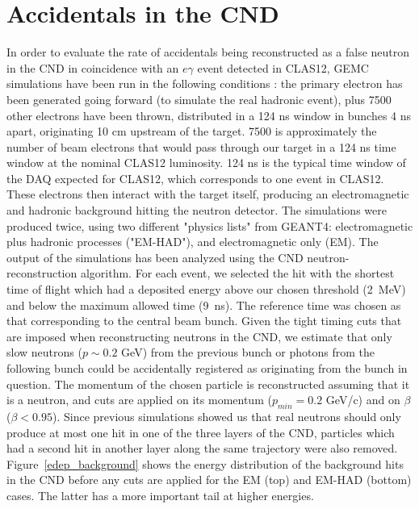 \section{Accidentals in the CND}\label{sec_accidentals}

In order to evaluate the rate of accidentals being reconstructed as a false neutron in the CND in coincidence with an $e\gamma$ event detected in CLAS12, GEMC simulations have been run in the following conditions \cite{raffa,proposal}: the primary electron has been generated going forward (to simulate the real hadronic event), plus 7500 other electrons have been thrown, distributed in a 124 ns window in bunches 4 ns apart, originating 10 cm upstream of the target. 7500 is approximately the number of beam electrons that would pass through our target in a 124 ns time window at the nominal CLAS12 luminosity. 124 ns is the typical time window of the DAQ expected for CLAS12, which corresponds to one event in CLAS12. These electrons then interact with the target itself, producing an electromagnetic and hadronic background hitting the neutron detector. The simulations were produced twice, using two different "physics lists" from GEANT4: electromagnetic plus hadronic processes ("EM-HAD"), and electromagnetic only (EM). The output of the simulations has been analyzed using the CND neutron-reconstruction algorithm. For each event, we selected the hit with the shortest time of flight which had a deposited energy above our chosen threshold (2~MeV) and below the maximum allowed time (9~ns). The reference time was chosen as that corresponding to the central beam bunch. Given the tight timing cuts that are imposed when reconstructing neutrons in the CND, we estimate that only slow neutrons ($p\sim 0.2$ GeV) from the previous bunch or photons from the following bunch could be accidentally registered as originating from the bunch in question. The momentum of the chosen particle is reconstructed assuming that it is a neutron, and cuts are applied on its momentum ($p_{min}= 0.2$ GeV/c) and on $\beta$ ($\beta<0.95$). Since previous simulations showed us that real neutrons should only produce at most one hit in one of the three layers of the CND, particles which had a second hit in another layer along the same trajectory were also removed. 
Figure~\ref{edep_background} shows the energy distribution of the background hits in the CND before any cuts are applied for the EM (top) and EM-HAD (bottom) cases. The latter has a more important tail at higher energies. 

